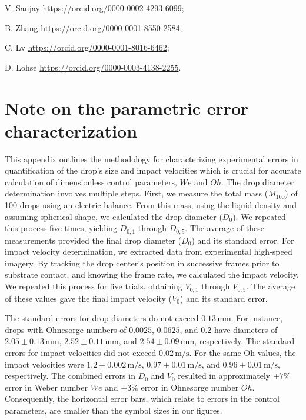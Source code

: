 \documentclass{jfm}
\newcommand{\oo}{\color{magenta} \normalfont}
\newcommand{\bb}{\color{black} \normalfont}
\begin{document}

V. Sanjay \href{https://orcid.org/0000-0002-4293-6099}{https://orcid.org/0000-0002-4293-6099}; 

B. Zhang \href{https://orcid.org/0000-0001-8550-2584}{https://orcid.org/0000-0001-8550-2584};

C. Lv \href{https://orcid.org/0000-0001-8016-6462}{https://orcid.org/0000-0001-8016-6462};

D. Lohse \href{https://orcid.org/0000-0003-4138-2255}{https://orcid.org/0000-0003-4138-2255}. \\

\appendix
\renewcommand{\thefigure}{\Alph{section}\,\arabic{figure}}
\setcounter{figure}{0}

\oo
\section{Note on the parametric error characterization}
\label{app:error}

This appendix outlines the methodology for characterizing experimental errors in quantification of the drop's size and impact velocities which is crucial for accurate calculation of dimensionless control parameters, $We$ and $Oh$.
The drop diameter determination involves multiple steps. First, we measure the total mass ($M_{100}$) of 100 drops using an electric balance. From this mass, using the liquid density and assuming spherical shape, we calculated the drop diameter ($D_0$). 
We repeated this process five times, yielding $D_{0,1}$ through $D_{0,5}$. The average of these measurements provided the final drop diameter ($D_0$) and its standard error.
For impact velocity determination, we extracted data from experimental high-speed imagery. By tracking the drop center's position in successive frames prior to substrate contact, and knowing the frame rate, we calculated the impact velocity. We repeated this process for five trials, obtaining $V_{0,1}$ through $V_{0,5}$. The average of these values gave the final impact velocity ($V_0$) and its standard error.

The standard errors for drop diameters do not exceed $0.13\,\si{\milli\meter}$. For instance, drops with Ohnesorge numbers of $0.0025$, $0.0625$, and $0.2$ have diameters of $2.05 \pm 0.13\,\si{\milli\meter}$, $2.52 \pm 0.11\,\si{\milli\meter}$, and $2.54 \pm 0.09\,\si{\milli\meter}$, respectively. 
The standard errors for impact velocities did not exceed $0.02\,\si{\meter}/\si{\second}$. For the same Oh values, the impact velocities were $1.2 \pm 0.002\,\si{\meter}/\si{\second}$, $0.97 \pm 0.01\,\si{\meter}/\si{\second}$, and $0.96 \pm 0.01\,\si{\meter}/\si{\second}$, respectively.
The combined errors in $D_0$ and $V_0$ resulted in approximately $\pm 7\%$ error in Weber number $We$ and $\pm 3\%$ error in Ohnesorge number $Oh$. Consequently, the horizontal error bars, which relate to errors in the control parameters, are smaller than the symbol sizes in our figures.
\bb
\end{document}
